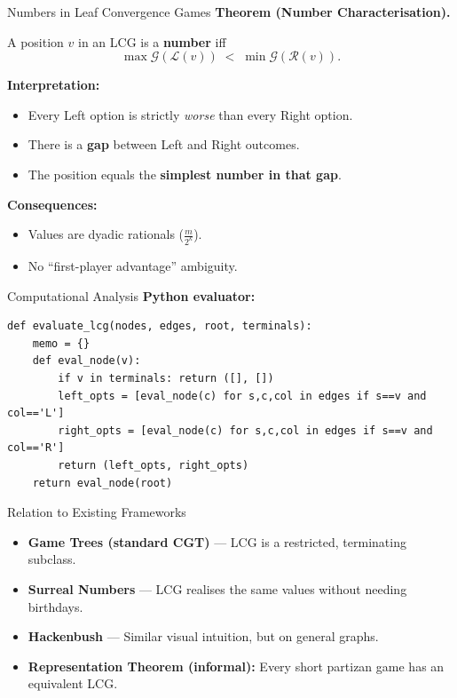 \documentclass[10pt,aspectratio=169]{beamer}
\begin{document}
\begin{frame}{Numbers in Leaf Convergence Games}
\textbf{Theorem (Number Characterisation).}

A position $v$ in an LCG is a \textbf{number} iff
\[
\max \mathcal{G}(\mathcal{L}(v)) \;<\; \min \mathcal{G}(\mathcal{R}(v)).
\]

\vspace{10pt}

\textbf{Interpretation:}
\begin{itemize}
  \item Every Left option is strictly \emph{worse} than every Right option.
  \item There is a \textbf{gap} between Left and Right outcomes.
  \item The position equals the \textbf{simplest number in that gap}.
\end{itemize}

\vspace{10pt}

\textbf{Consequences:}
\begin{itemize}
  \item Values are dyadic rationals ($\frac{m}{2^k}$).
  \item No “first-player advantage” ambiguity.
\end{itemize}
\end{frame}

\begin{frame}[fragile]{Computational Analysis}
  \textbf{Python evaluator:}
  \begin{lstlisting}
def evaluate_lcg(nodes, edges, root, terminals):
    memo = {}
    def eval_node(v):
        if v in terminals: return ([], [])
        left_opts = [eval_node(c) for s,c,col in edges if s==v and col=='L']
        right_opts = [eval_node(c) for s,c,col in edges if s==v and col=='R']
        return (left_opts, right_opts)
    return eval_node(root)
  \end{lstlisting}
\end{frame}


\begin{frame}{Relation to Existing Frameworks}
  \begin{itemize}
    \item \textbf{Game Trees (standard CGT)} — LCG is a restricted, terminating subclass.
    \item \textbf{Surreal Numbers} — LCG realises the same values without needing birthdays.
    \item \textbf{Hackenbush} — Similar visual intuition, but on general graphs.
    \item \textbf{Representation Theorem (informal):} Every short partizan game has an equivalent LCG.
  \end{itemize}
\end{frame}
\end{document}

